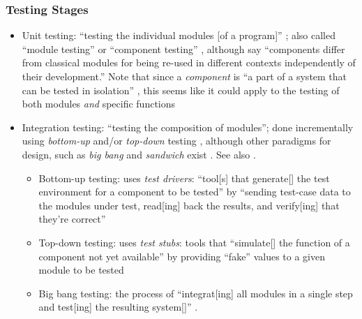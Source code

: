 \subsubsection{Testing Stages}
\begin{itemize}
      \item Unit testing: ``testing the individual modules [of a program]''
            \citep[p.~438]{vanVliet2000}; also called ``module testing''
            \citep[p.~109]{Patton2006} or ``component testing''
            \citep[p.~444]{PetersAndPedrycz2000}, although
            \citet[p.~107]{BaresiAndPezzè2006} say ``components differ from
            classical modules for being re-used in different contexts
            independently of their development.'' Note that since a
            \emph{component} is ``a part of a system that can be tested in
            isolation'' \citep{ISTQB}, this seems like it could apply
            to the testing of both modules \emph{and} specific functions
      \item Integration testing: ``testing the composition of modules'';
            done incrementally using \emph{bottom-up} and/or
            \emph{top-down} testing \citep[pp.~438-439]{vanVliet2000},
            although other paradigms for design, such as \emph{big bang} and
            \emph{sandwich} exist \citep[p.~489]{PetersAndPedrycz2000}.
            See also \citep[p.~109]{Patton2006}.
            \begin{itemize}
                  \item Bottom-up testing: uses \emph{test drivers}: ``tool[s]
                        that generate[] the test environment for a component to
                        be tested'' \citep[p.~410]{vanVliet2000} by
                        ``sending test-case data to the modules under test,
                        read[ing] back the results, and verify[ing] that
                        they're correct'' \citep[p.~109]{Patton2006}
                  \item Top-down testing: uses \emph{test stubs}: tools that
                        ``simulate[] the function of a component not yet
                        available'' \citep[p.~410]{vanVliet2000} by
                        providing ``fake'' values to a given module to be
                        tested \citep[p.~110]{Patton2006}
                  \item Big bang testing: the process of ``integrat[ing] all
                        modules in a single step and test[ing] the resulting
                        system[]'' \citep[p.~489]{PetersAndPedrycz2000}.

\end{itemize}
\end{itemize}
